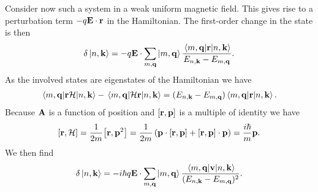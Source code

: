 Consider now such a system in a weak uniform magnetic field. This gives rise to a perturbation term $-q\vb{E}\cdot\vb{r}$ in the Hamiltonian. The first-order change in the state is then
\begin{align*}
	\delta\ket{n, \vb{k}} = -q\vb{E}\cdot\sum\limits_{m, \vb{q}}\ket{m, \vb{q}}\frac{\mel{m, \vb{q}}{\vb{r}}{n, \vb{k}}}{E_{n, \vb{k}} - E_{m, \vb{q}}}.
\end{align*}
As the involved states are eigenstates of the Hamiltonian we have
\begin{align*}
	\mel{m, \vb{q}}{\vb{r}\ensuremath{\mathcal{H}}}{n, \vb{k}} - \mel{m, \vb{q}}{\ensuremath{\mathcal{H}}\vb{r}}{n, \vb{k}} = (E_{n, \vb{k}} - E_{m, \vb{q}})\mel{m, \vb{q}}{\vb{r}}{n, \vb{k}}.
\end{align*}
Because $\vb{A}$ is a function of position and $\comm{\vb{r}}{\vb{p}}$ is a multiple of identity we have
\begin{align*}
	\comm{\vb{r}}{\ham} = \frac{1}{2m}\comm{\vb{r}}{\vb{p}^{2}} = \frac{1}{2m}\left(\vb{p}\cdot\comm{\vb{r}}{\vb{p}} + \comm{\vb{r}}{\vb{p}}\cdot\vb{p}\right) = \frac{i\hbar}{m}\vb{p}.
\end{align*}
We then find
\begin{align*}
	\delta\ket{n, \vb{k}} = -i\hbar q\vb{E}\cdot\sum\limits_{m, \vb{q}}\ket{m, \vb{q}}\frac{\mel{m, \vb{q}}{\vb{v}}{n, \vb{k}}}{(E_{n, \vb{k}} - E_{m, \vb{q}})^{2}}.
\end{align*}

